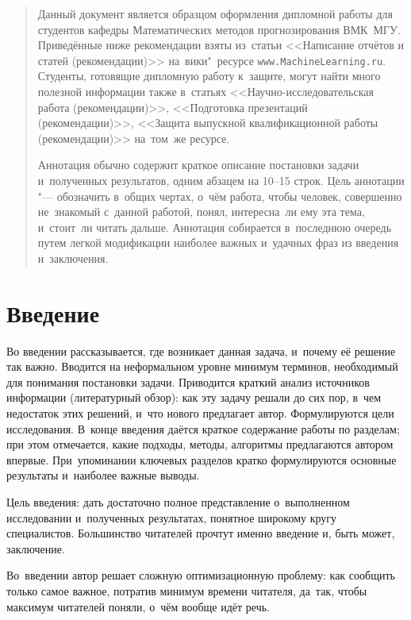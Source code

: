 \documentclass[12pt,fleqn]{article}
\begin{document}
\newpage
\renewcommand{\contentsname}{Содержание}
\tableofcontents

\newpage
\begin{abstract}
    Данный документ является образцом оформления дипломной работы для
    студентов кафедры Математических методов прогнозирования ВМК~МГУ.
    Приведённые ниже рекомендации взяты из~статьи <<Написание отчётов
    и статей (рекомендации)>> на~вики"~ресурсе
    \texttt{www.MachineLearning.ru}.  Студенты, готовящие дипломную
    работу к~защите, могут найти много полезной информации также
    в~статьях <<Научно-исследовательская работа (рекомендации)>>,
    <<Подготовка презентаций (рекомендации)>>, <<Защита выпускной
    квалификационной работы (рекомендации)>> на~том~же ресурсе.

    Аннотация обычно содержит краткое описание постановки задачи
    и~полученных результатов, одним абзацем на 10--15 строк.  Цель
    аннотации "--- обозначить в~общих чертах, о~чём работа, чтобы
    человек, совершенно не~знакомый с~данной работой, понял,
    интересна~ли ему эта тема, и~стоит~ли читать дальше.  Аннотация
    собирается в~последнюю очередь путем легкой модификации наиболее
    важных и~удачных фраз из введения и~заключения.
\end{abstract}

\newpage
\section{Введение}

Во введении рассказывается, где возникает данная задача, и~почему её
решение так важно.  Вводится на неформальном уровне минимум терминов,
необходимый для понимания постановки задачи.  Приводится краткий
анализ источников информации (литературный обзор): как эту задачу
решали до сих пор, в~чем недостаток этих решений, и~что нового
предлагает автор.  Формулируются цели исследования.  В~конце введения
даётся краткое содержание работы по разделам; при этом отмечается,
какие подходы, методы, алгоритмы предлагаются автором впервые.
При~упоминании ключевых разделов кратко формулируются основные
результаты и~наиболее важные выводы.

Цель введения: дать достаточно полное представление о~выполненном
исследовании и~полученных результатах, понятное широкому кругу
специалистов.  Большинство читателей прочтут именно введение и, быть
может, заключение.

Во~введении автор решает сложную оптимизационную проблему: как
сообщить только самое важное, потратив минимум времени читателя,
да~так, чтобы максимум читателей поняли, о~чём вообще идёт речь.
\end{document}
